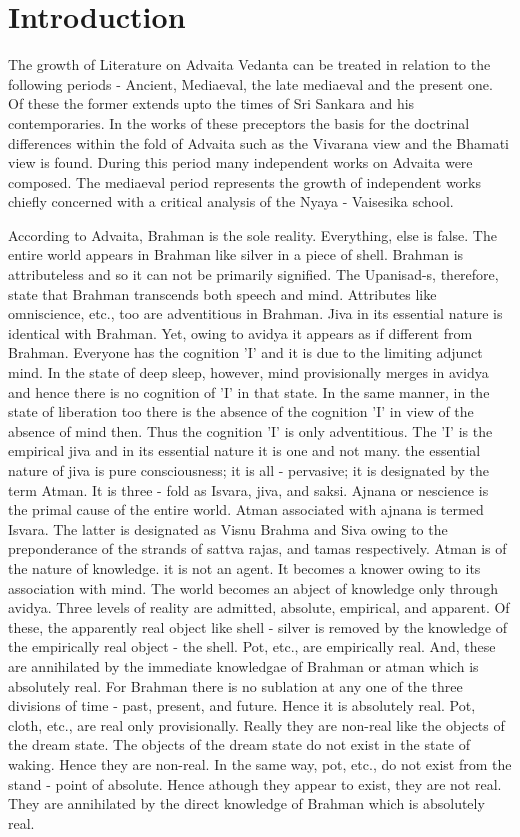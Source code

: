 \chapter{Introduction}
The growth of Literature on Advaita Vedanta can be treated in relation to the following periods - Ancient, Mediaeval, the late mediaeval and the present one. Of these the former extends upto the times of Sri Sankara and his contemporaries. In the works of these preceptors the basis for the doctrinal differences within the fold of Advaita such as the Vivarana view and the Bhamati view is found. During this period many independent works on Advaita were composed. The mediaeval period represents the growth of independent works chiefly concerned with a critical analysis of the Nyaya - Vaisesika school. 

According to Advaita, Brahman is the sole reality. Everything, else is false. The entire world appears in Brahman like silver in a piece of shell. Brahman is attributeless and so it can not be primarily signified. The Upanisad-s, therefore, state that Brahman transcends both speech and mind. Attributes like omniscience, etc., too are adventitious in Brahman. Jiva in its essential nature is identical with Brahman. Yet, owing to avidya it appears as if different from Brahman. Everyone has the cognition 'I' and it is due to the limiting adjunct mind. In the state of deep sleep, however, mind provisionally merges in avidya and hence there is no cognition of 'I' in that state. In the same manner, in the state of liberation too there is the absence of the cognition 'I' in view of the absence of mind then. Thus the cognition 'I' is only adventitious. The 'I' is the empirical jiva and in its essential nature it is one and not many. the essential nature of jiva is pure consciousness; it is all - pervasive; it is designated by the term Atman. It is three - fold as Isvara, jiva, and saksi. Ajnana or nescience is the primal cause of the entire world. Atman associated with ajnana is termed Isvara. The latter is designated as Visnu Brahma and Siva owing to the preponderance of the strands of sattva rajas, and tamas respectively. Atman is of the nature of knowledge. it is not an agent. It becomes a knower owing to its association with mind. The world becomes an abject of knowledge only through avidya. Three levels of reality are admitted, absolute, empirical, and apparent. Of these, the apparently real object like shell - silver is removed by the knowledge of the empirically real object - the shell. Pot, etc., are empirically real. And, these are annihilated by the immediate knowledgae of Brahman or atman which is absolutely real. For Brahman there is no sublation at any one of the three divisions of time - past, present, and future. Hence it is absolutely real. Pot, cloth, etc., are real only provisionally. Really they are non-real like the objects of the dream state. The objects of the dream state do not exist in the state of waking. Hence they are non-real. In the same way, pot, etc., do not exist from the stand - point of absolute. Hence athough they appear to exist, they are not real. They are annihilated by the direct knowledge of Brahman which is absolutely real.

